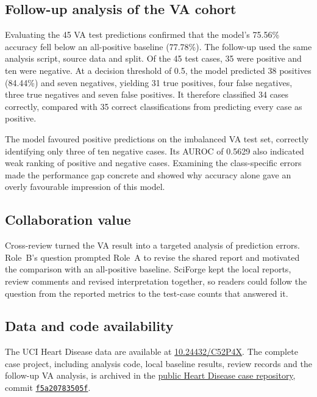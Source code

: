 \subsection{Follow-up analysis of the VA cohort}
Evaluating the 45 VA test predictions confirmed that the model's 75.56\% accuracy fell below an all-positive baseline (77.78\%). The follow-up used the same analysis script, source data and split. Of the 45 test cases, 35 were positive and ten were negative. At a decision threshold of 0.5, the model predicted 38 positives (84.44\%) and seven negatives, yielding 31 true positives, four false negatives, three true negatives and seven false positives. It therefore classified 34 cases correctly, compared with 35 correct classifications from predicting every case as positive.

The model favoured positive predictions on the imbalanced VA test set, correctly identifying only three of ten negative cases. Its AUROC of 0.5629 also indicated weak ranking of positive and negative cases. Examining the class-specific errors made the performance gap concrete and showed why accuracy alone gave an overly favourable impression of this model.

\subsection{Collaboration value}
Cross-review turned the VA result into a targeted analysis of prediction errors. Role~B's question prompted Role~A to revise the shared report and motivated the comparison with an all-positive baseline. SciForge kept the local reports, review comments and revised interpretation together, so readers could follow the question from the reported metrics to the test-case counts that answered it.

\subsection{Data and code availability}
The UCI Heart Disease data are available at \href{https://doi.org/10.24432/C52P4X}{10.24432/C52P4X}. The complete case project, including analysis code, local baseline results, review records and the follow-up VA analysis, is archived in the \href{https://github.com/MultiHugo/sciforge-heart-disease-collaboration}{public Heart Disease case repository}, commit \href{https://github.com/MultiHugo/sciforge-heart-disease-collaboration/commit/f5a20783505fa179e3cdbeb756f6ed0e594e7784}{\texttt{f5a20783505f}}.
